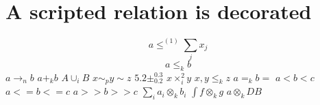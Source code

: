 \documentclass{article}
\begin{document}
\section{A scripted relation is decorated}
\[ a\leq^{(1)}\sum_j x_j \]
\[ a\leq_k b \]
$a\to_n b$ $a+_k b$ $A\cup_i B$ $x\sim_p y\sim z$ $5.2\pm^{0.3}_{0.2}$ $x\times_i^2 y$
$x,y\le_{k} z$ $a=_{k}b=$ $a<b<c$ $a<=b<=c$ $a>>b>>c$
$\sum_i a_i\otimes_k b_i$ $\int f\otimes_{k}g$ $a\otimes_{k}DB$
\end{document}

